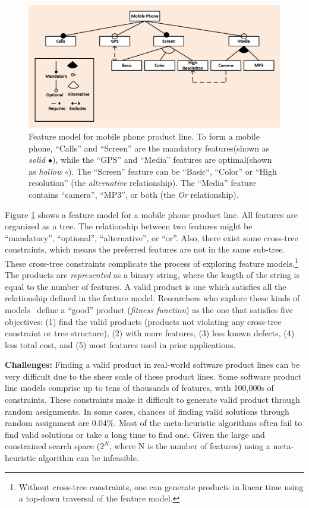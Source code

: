 \documentclass[sigconf]{acmart}
\begin{document}
\begin{figure}[!t]
    \small
    \includegraphics[width=\linewidth]{img/ft.png}
    \caption{Feature model for mobile phone product line. To form a mobile phone, ``Calls'' and ``Screen'' are the mandatory features(shown as \textit{solid $\bullet$}), while the ``GPS'' and ``Media'' features are optimal(shown as \textit{hollow $\circ$}). The ``Screen'' feature can be ``Basic``, ``Color'' or ``High resolution'' (the \textit{alternative} relationship). The ``Media'' feature contains ``camera'', ``MP3'', or both (the \textit{Or} relationship).}
    \label{fig:mobile}
\end{figure}


Figure \ref{fig:mobile} shows a feature model for a mobile phone
product line. All features are organized as a tree. The relationship
between two features might be ``mandatory'', ``optional'',
``alternative'', or ``or''. Also, there exist some cross-tree constraints, which means the preferred features are not in the same sub-tree. These cross-tree constraints complicate the process of exploring feature models.\footnote{Without cross-tree constraints, one can generate products in linear time using a top-down traversal of the feature model.} The products are \textit{represented} as a binary string, where the length of the string is equal to the number of features. A valid product is one which satisfies all the relationship defined in the feature model.
Researchers who explore these kinds of models~\cite{sayyad13a, sayyad13b, harman2014search, henard2015combining}
define a ``good'' product (\textit{fitness function}) as the one that satisfies five objectives:
(1) find the valid products (products not violating any cross-tree constraint or tree structure), (2) with more features, (3) less known defects, (4) less total cost, and (5) most features used in prior applications.

\noindent\textbf{Challenges: } Finding a valid product in real-world software product lines can be very difficult due to the sheer scale of these product lines. Some software product line models comprise up to tens of thousands
of features,  with 100,000s of constraints. These constraints make it difficult to generate valid product through random assignments. In some cases, chances of finding valid solutions through random assignment are $0.04\%$. Most of the meta-heuristic algorithms often fail to find valid solutions or take a long time to find one. Given the large and constrained search space ($2^N$, where N is the number of features) using a meta-heuristic algorithm can be infeasible.
\end{document}
